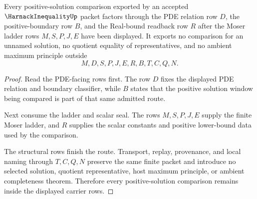 \begin{theorem}
\label{thm:harnack-inequality-positive-solution-boundary}
Every positive-solution comparison exported by an accepted $\HarnackInequalityUp$ packet factors through the PDE relation row $D$, the positive-boundary row $B$, and the Real-bound readback row $R$ after the Moser ladder rows $M,S,P,J,E$ have been displayed. It exports no comparison for an unnamed solution, no quotient equality of representatives, and no ambient maximum principle outside
$$
M,D,S,P,J,E,R,B,T,C,Q,N.
$$
\end{theorem}
\begin{proof}
Read the PDE-facing rows first. The row $D$ fixes the displayed PDE relation and boundary classifier, while $B$ states that the positive solution window being compared is part of that same admitted route.

Next consume the ladder and scalar seal. The rows $M,S,P,J,E$ supply the finite Moser ladder, and $R$ supplies the scalar constants and positive lower-bound data used by the comparison.

The structural rows finish the route. Transport, replay, provenance, and local naming through $T,C,Q,N$ preserve the same finite packet and introduce no selected solution, quotient representative, host maximum principle, or ambient completeness theorem. Therefore every positive-solution comparison remains inside the displayed carrier rows.
\end{proof}




